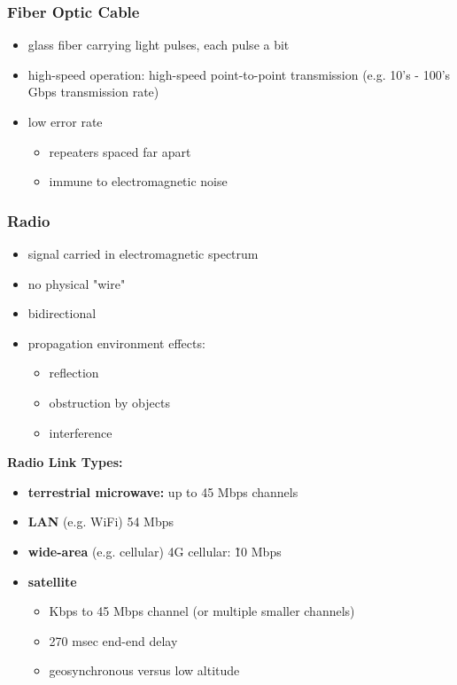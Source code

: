 \documentclass[12pt, a4paper]{article}
\begin{document}
\begin{multicols*}{2}
\subsubsection{Fiber Optic Cable}
\begin{itemize}
	\item glass fiber carrying light pulses, each pulse a bit
	\item high-speed operation: high-speed point-to-point transmission (e.g. 10's - 100's Gbps transmission rate)
	\item low error rate
	\begin{itemize}
		\item repeaters spaced far apart
		\item immune to electromagnetic noise
	\end{itemize}
\end{itemize}
\subsubsection{Radio}
\begin{itemize}
	\item signal carried in electromagnetic spectrum
	\item no physical "wire"
	\item bidirectional
	\item propagation environment effects:
	\begin{itemize}
		\item reflection
		\item obstruction by objects
		\item interference
	\end{itemize}
\end{itemize}
\textbf{Radio Link Types:}
\begin{itemize}
	\item \textbf{terrestrial microwave:} up to 45 Mbps channels
	\item \textbf{LAN} (e.g. WiFi) 54 Mbps
	\item \textbf{wide-area} (e.g. cellular) 4G cellular: \~ 10 Mbps
	\item \textbf{satellite}
	\begin{itemize}
		\item Kbps to 45 Mbps channel (or multiple smaller channels)
		\item 270 msec end-end delay
		\item geosynchronous versus low altitude
	\end{itemize}
\end{itemize}


\end{multicols*}
\end{document}
